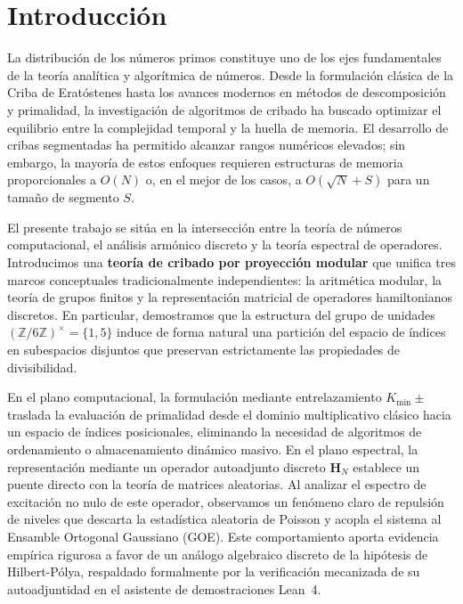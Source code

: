 \documentclass{article}
\numberwithin{equation}{section}
\theoremstyle{plain}
\theoremstyle{definition}
\begin{document}
\maketitle

\section{Introducción}

La distribución de los números primos constituye uno de los ejes fundamentales de la teoría analítica y algorítmica de números. Desde la formulación clásica de la Criba de Eratóstenes hasta los avances modernos en métodos de descomposición y primalidad, la investigación de algoritmos de cribado ha buscado optimizar el equilibrio entre la complejidad temporal y la huella de memoria. El desarrollo de cribas segmentadas \cite{Sorenson1998, Galway2004} ha permitido alcanzar rangos numéricos elevados; sin embargo, la mayoría de estos enfoques requieren estructuras de memoria proporcionales a $O(N)$ o, en el mejor de los casos, a $O(\sqrt{N}+S)$ para un tamaño de segmento $S$.

El presente trabajo se sitúa en la intersección entre la teoría de números computacional, el análisis armónico discreto y la teoría espectral de operadores. Introducimos una \textbf{teoría de cribado por proyección modular} que unifica tres marcos conceptuales tradicionalmente independientes: la aritmética modular, la teoría de grupos finitos y la representación matricial de operadores hamiltonianos discretos. En particular, demostramos que la estructura del grupo de unidades $(\mathbb{Z}/6\mathbb{Z})^\times = \{1,5\}$ induce de forma natural una partición del espacio de índices en subespacios disjuntos que preservan estrictamente las propiedades de divisibilidad.

En el plano computacional, la formulación mediante entrelazamiento $K_{\min}\pm$ traslada la evaluación de primalidad desde el dominio multiplicativo clásico hacia un espacio de índices posicionales, eliminando la necesidad de algoritmos de ordenamiento o almacenamiento dinámico masivo. En el plano espectral, la representación mediante un operador autoadjunto discreto $\mathbf{H}_N$ establece un puente directo con la teoría de matrices aleatorias. Al analizar el espectro de excitación no nulo de este operador, observamos un fenómeno claro de repulsión de niveles que descarta la estadística aleatoria de Poisson y acopla el sistema al Ensamble Ortogonal Gaussiano (GOE). Este comportamiento aporta evidencia empírica rigurosa a favor de un análogo algebraico discreto de la hipótesis de Hilbert-Pólya, respaldado formalmente por la verificación mecanizada de su autoadjuntidad en el asistente de demostraciones Lean~4.
\end{document}
